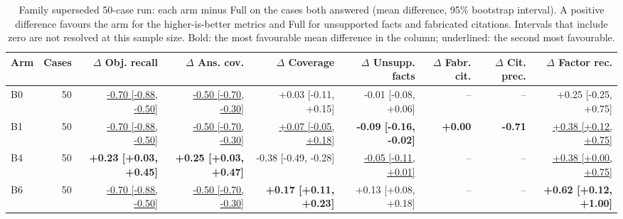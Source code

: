\begin{table}[t]
\centering\footnotesize
\begin{adjustbox}{max width=\textwidth}
\begin{tabular}{@{}lrrrrrrrr@{}}
\toprule
Arm & Cases & $\Delta$ Obj. recall & $\Delta$ Ans. cov. & $\Delta$ Coverage & $\Delta$ Unsupp. facts & $\Delta$ Fabr. cit. & $\Delta$ Cit. prec. & $\Delta$ Factor rec. \\
\midrule
B0 & 50 & \underline{-0.70 [-0.88, -0.50]} & \underline{-0.50 [-0.70, -0.30]} & +0.03 [-0.11, +0.15] & -0.01 [-0.08, +0.06] & -- & -- & +0.25 [-0.25, +0.75] \\
B1 & 50 & \underline{-0.70 [-0.88, -0.50]} & \underline{-0.50 [-0.70, -0.30]} & \underline{+0.07 [-0.05, +0.18]} & \textbf{-0.09 [-0.16, -0.02]} & \textbf{+0.00} & \textbf{-0.71} & \underline{+0.38 [+0.12, +0.75]} \\
B4 & 50 & \textbf{+0.23 [+0.03, +0.45]} & \textbf{+0.25 [+0.03, +0.47]} & -0.38 [-0.49, -0.28] & \underline{-0.05 [-0.11, +0.01]} & -- & -- & \underline{+0.38 [+0.00, +0.75]} \\
B6 & 50 & \underline{-0.70 [-0.88, -0.50]} & \underline{-0.50 [-0.70, -0.30]} & \textbf{+0.17 [+0.11, +0.23]} & +0.13 [+0.08, +0.18] & -- & -- & \textbf{+0.62 [+0.12, +1.00]} \\
\bottomrule
\end{tabular}
\end{adjustbox}
\caption{Family superseded 50-case run: each arm minus Full on the cases both answered (mean difference, 95\% bootstrap interval). A positive difference favours the arm for the higher-is-better metrics and Full for unsupported facts and fabricated citations. Intervals that include zero are not resolved at this sample size. Bold: the most favourable mean difference in the column; underlined: the second most favourable.}
\label{tab:ablate_v1}
\end{table}